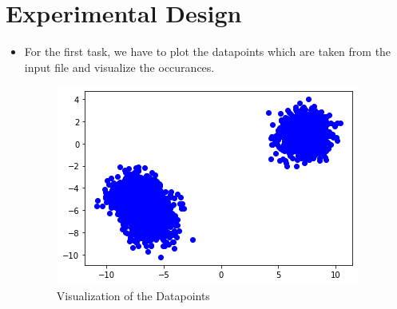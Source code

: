 \documentclass[conference]{IEEEtran}
\begin{document}
\section{Experimental Design}
\begin{itemize}  
\item For the first task, we have to plot the datapoints which are taken from the input file and visualize the occurances.
\begin{figure}[htb!]
\centerline{\includegraphics[scale=0.5]{51.png}}
\caption{Visualization of the Datapoints\\}
\label{fig}
\end{figure}


\end{itemize}
\end{document}
